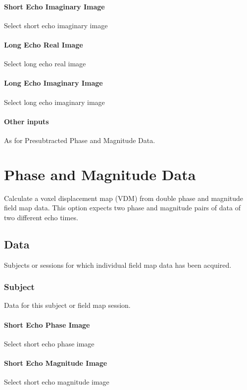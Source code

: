 \paragraph{Short Echo Imaginary Image}
Select short echo imaginary image


\paragraph{Long Echo Real Image}
Select long echo real image


\paragraph{Long Echo Imaginary Image}
Select long echo imaginary image

\paragraph{Other inputs}
As for Presubtracted Phase and Magnitude Data.

\section{Phase and Magnitude Data}
Calculate a voxel displacement map (VDM) from double phase and magnitude field map data. This option expects two phase and magnitude pairs of data of two different echo times.


\subsection{Data}
Subjects or sessions for which individual field map data has been acquired.


\subsubsection{Subject}
Data for this subject or field map session.


\paragraph{Short Echo Phase Image}
Select short echo phase image


\paragraph{Short Echo Magnitude Image}
Select short echo magnitude image


